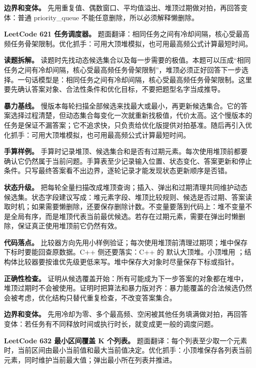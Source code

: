 \textbf{边界和变体。} 先用重复值、偶数窗口、平均值溢出、堆顶过期做对拍，再回答变体：普通 priority\_queue 不能任意删除，所以必须解释懒删除。

\noindent\textbf{LeetCode 621 任务调度器。} 题面翻译：相同任务之间有冷却间隔，核心受最高频任务骨架限制。优化抓手：可用大顶堆模拟，也可用最高频公式计算最短时间。

\textbf{读题拆解。} 读题时先找动态候选集合以及每一步需要的极值。本题可以压成“相同任务之间有冷却间隔，核心受最高频任务骨架限制”，堆顶必须正好回答下一步选择。一句话模型是：相同任务之间有冷却间隔，核心受最高频任务骨架限制。这里要先确认答案对象、合法性条件和优化目标，不要把题型名字当成推导。

\textbf{暴力基线。} 慢版本每轮扫描全部候选来找最大或最小，再更新候选集合。它的答案选择过程清楚，但动态集合每变化一次就重新找极值，代价太高。这个慢版本的任务是保证不漏答案；它不追求快，只负责给优化版提供对拍基准。随后再引入优化抓手：可用大顶堆模拟，也可用最高频公式计算最短时间。

\textbf{手算样例。} 手算时记录堆顶、候选集合和是否有过期元素。每次使用堆顶前都要确认它仍然属于当前问题。手算表至少记录输入位置、状态变化、答案更新和停止条件。只写最终答案看不出边界，逐轮记录才能发现状态更新顺序是否错。

\textbf{状态升级。} 把每轮全量扫描改成堆顶查询；插入、弹出和过期清理共同维护动态候选集。状态字段建议写成：堆元素字段、堆顶比较规则、候选是否过期、答案读取时机；如果需要懒删除，还要保存删除计数。不变量要落到代码上：堆不变量不是全局有序，而是堆顶代表当前最优候选。若存在过期元素，需要在弹出时懒删除，保证真正使用堆顶前它仍然有效。

\textbf{代码落点。} 比较器方向先用小样例验证；每次使用堆顶前清理过期项；堆中保存下标时要能回查原数据。C++ 侧还要落实：C++ 的  默认大顶堆。小顶堆用 ；结构体比较器要按谁优先级更低来写。堆中保存大对象时尽量保存下标或指针。

\textbf{正确性检查。} 证明从候选覆盖开始：所有可能成为下一步答案的对象都在堆中，堆顶过期时不会被使用。证明时把算法和暴力版对齐：暴力能覆盖的合法候选仍然会被考虑，优化结构只替代重复检查，不改变答案集合。

\textbf{边界和变体。} 先用冷却为零、多个最高频、空闲被其他任务填满做对拍，再回答变体：若任务有不同释放时间或执行时长，就变成更一般的调度问题。

\noindent\textbf{LeetCode 632 最小区间覆盖 K 个列表。} 题面翻译：每个列表至少取一个元素时，当前区间由最小当前值和最大当前值决定。优化抓手：小顶堆保存各列表当前元素，同时维护当前最大值；弹出最小所在列表并推进。

